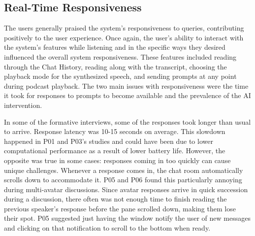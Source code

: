 \documentclass[12pt]{report}
\begin{document}
\begin{myfont}
        \subsection{Real-Time Responsiveness}
        The users generally praised the system's responsiveness to queries, contributing positively to the user experience. Once again,  the user's ability to interact with the system's features while listening and in the specific ways they desired influenced the overall system responsiveness. These features included reading through the Chat History, reading along with the transcript, choosing the playback mode for the synthesized speech, and sending prompts at any point during podcast playback. The two main issues with responsiveness were the time it took for responses to prompts to become available and the prevalence of the AI intervention.

        \indent In some of the formative interviews, some of the responses took longer than usual to arrive. Response latency was 10-15 seconds on average. This slowdown happened in P01 and P03's studies and could have been due to lower computational performance as a result of lower battery life. However, the opposite was true in some cases: responses coming in too quickly can cause unique challenges. Whenever a response comes in, the chat room automatically scrolls down to accommodate it. P05 and P06 found this particularly annoying during multi-avatar discussions. Since avatar responses arrive in quick succession during a discussion, there often was not enough time to finish reading the previous speaker's response before the pane scrolled down, making them lose their spot. P05 suggested just having the window notify the user of new messages and clicking on that notification to scroll to the bottom when ready.


\end{myfont}
\end{document}
